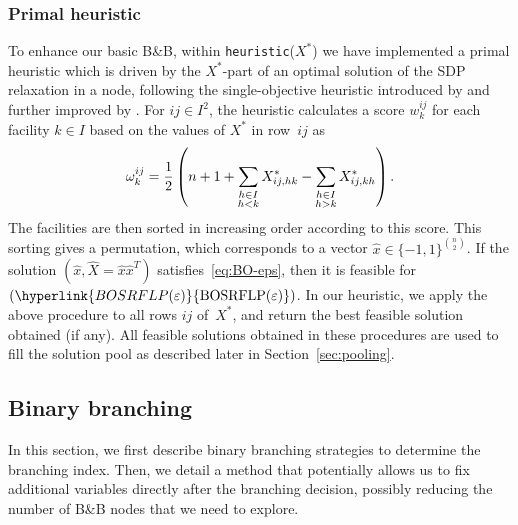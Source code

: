 \documentclass{article}
\newcommand{\myrefmath}[1]{(\hyperlink{#1}{\mathrm{#1}})}
\newcommand{\fourindex}{h}
\newcommand{\BB}{B\&B\xspace}
\begin{document}
\subsubsection{Primal heuristic}\label{sec:heur}
To enhance our basic \BB, within \texttt{heuristic}($X^*$) we have implemented a primal heuristic which is driven by the $X^*$-part of an optimal solution of the SDP relaxation in a node, following the single-objective heuristic introduced by \citet{anjos_semidefinite_2005} and further improved by \citet{ANJOS2006}.
For $ij \in I^2$, the heuristic calculates a score $w^{ij}_k$ for each facility $k\in I$ based on the values of $X^*$ in row~$ij$ as 
\begin{equation}
    \omega_k^{ij} = \frac{1}{2}\left(n + 1 + \sum_{\substack{\fourindex \in I\\\fourindex < k}} X^*_{ij,\fourindex k} - \sum_{\substack{\fourindex \in I\\\fourindex > k}} X^*_{ij,k\fourindex} \right). \notag
\end{equation}
The facilities are then sorted in increasing order according to this score. This sorting gives a permutation, which corresponds to a vector $\hat x \in\{-1,1\}^{\binom{n}{2}}$. If the solution $(\hat x,\hat X=\hat x \hat x^T)$ satisfies~\eqref{eq:BO-eps}, then it is feasible for $\myrefmath{BOSRFLP(\varepsilon)}$. In our heuristic, we apply the above procedure to all rows $ij$ of~$X^*$, and return the best feasible solution obtained (if any). All feasible solutions obtained in these procedures are used to fill the solution pool as described later in Section~\ref{sec:pooling}.
\subsection{Binary branching}\label{sec:binarybranch}
In this section, we first describe binary branching strategies to determine the branching index. Then, we detail a method that potentially allows us to fix additional variables directly after the branching decision, possibly reducing the number of \BB nodes that we need to explore. 
\end{document}
